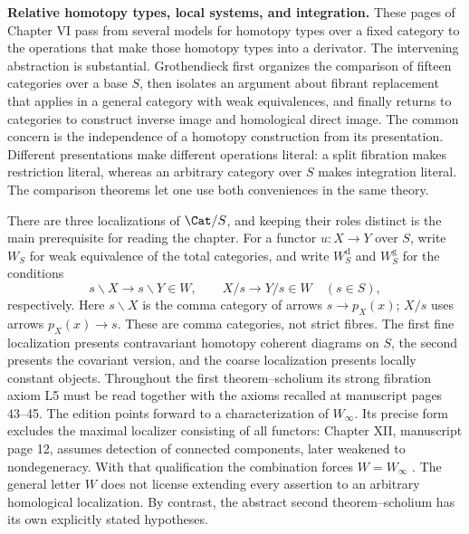 \noindent\textbf{Relative homotopy types, local systems, and integration.}
These pages of Chapter VI pass from several models for homotopy types over a
fixed category to the operations that make those homotopy types into a
derivator. The intervening abstraction is substantial. Grothendieck first
organizes the comparison of fifteen categories over a base $S$, then isolates
an argument about fibrant replacement that applies in a general category with
weak equivalences, and finally returns to categories to construct inverse
image and homological direct image. The common concern is the independence
of a homotopy construction from its presentation. Different presentations
make different operations literal: a split fibration makes restriction
literal, whereas an arbitrary category over $S$ makes integration literal.
The comparison theorems let one use both conveniences in the same theory.

There are three localizations of $\Cat/S$, and keeping their roles distinct is
the main prerequisite for reading the chapter. For a functor $u:X\to Y$ over
$S$, write $W_S$ for weak equivalence of the total categories, and write
$W_S^{\mathrm d}$ and $W_S^{\mathrm g}$ for the conditions
\[
 s\backslash X\longrightarrow s\backslash Y\in W,
 \qquad
 X/s\longrightarrow Y/s\in W
 \quad(s\in S),
\]
respectively. Here $s\backslash X$ is the comma category of arrows
$s\to p_X(x)$; $X/s$ uses arrows $p_X(x)\to s$. These are comma categories,
not strict fibres. The first fine localization presents contravariant
homotopy coherent diagrams on $S$, the second presents the covariant
version, and the coarse localization presents locally constant objects.
Throughout the first theorem--scholium its strong fibration axiom L5 must be
read together with the axioms recalled at manuscript pages 43--45. The
edition points forward to a characterization of $W_\infty$. Its precise
form excludes the maximal localizer consisting of all functors: Chapter
XII, manuscript page 12, assumes detection of connected components, later
weakened to nondegeneracy. With that qualification the combination forces
$W=W_\infty$ \citep[Chapter XII, manuscript pp.~12 and 20--22]{Grothendieck1990XIIa}.
The general letter $W$ does not license extending every assertion to an
arbitrary homological localization. By contrast, the abstract second
theorem--scholium has its own explicitly stated hypotheses.

